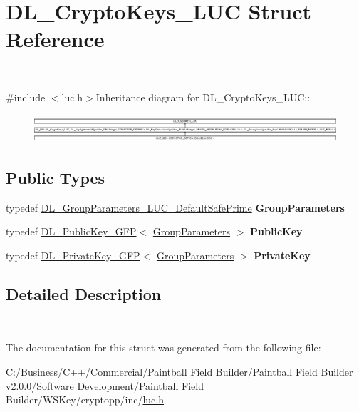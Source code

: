 \hypertarget{struct_d_l___crypto_keys___l_u_c}{
\section{DL\_\-CryptoKeys\_\-LUC Struct Reference}
\label{struct_d_l___crypto_keys___l_u_c}
}


\_\-  


{\ttfamily \#include $<$luc.h$>$}Inheritance diagram for DL\_\-CryptoKeys\_\-LUC::\begin{figure}[H]
\begin{center}
\leavevmode
\includegraphics[height=1.07417cm]{struct_d_l___crypto_keys___l_u_c}
\end{center}
\end{figure}
\subsection*{Public Types}
\begin{DoxyCompactItemize}
\item 
\hypertarget{struct_d_l___crypto_keys___l_u_c_a7f001656faa9ed50d3567a10a76617ec}{
typedef \hyperlink{class_d_l___group_parameters___l_u_c___default_safe_prime}{DL\_\-GroupParameters\_\-LUC\_\-DefaultSafePrime} {\bfseries GroupParameters}}
\label{struct_d_l___crypto_keys___l_u_c_a7f001656faa9ed50d3567a10a76617ec}

\item 
\hypertarget{struct_d_l___crypto_keys___l_u_c_a746c398250dea0027761656f8fec7436}{
typedef \hyperlink{class_d_l___public_key___g_f_p}{DL\_\-PublicKey\_\-GFP}$<$ \hyperlink{class_d_l___group_parameters___l_u_c___default_safe_prime}{GroupParameters} $>$ {\bfseries PublicKey}}
\label{struct_d_l___crypto_keys___l_u_c_a746c398250dea0027761656f8fec7436}

\item 
\hypertarget{struct_d_l___crypto_keys___l_u_c_a723cfe2baaaa390bea37b30a658551c7}{
typedef \hyperlink{class_d_l___private_key___g_f_p}{DL\_\-PrivateKey\_\-GFP}$<$ \hyperlink{class_d_l___group_parameters___l_u_c___default_safe_prime}{GroupParameters} $>$ {\bfseries PrivateKey}}
\label{struct_d_l___crypto_keys___l_u_c_a723cfe2baaaa390bea37b30a658551c7}

\end{DoxyCompactItemize}


\subsection{Detailed Description}
\_\- 

The documentation for this struct was generated from the following file:\begin{DoxyCompactItemize}
\item 
C:/Business/C++/Commercial/Paintball Field Builder/Paintball Field Builder v2.0.0/Software Development/Paintball Field Builder/WSKey/cryptopp/inc/\hyperlink{luc_8h}{luc.h}\end{DoxyCompactItemize}
